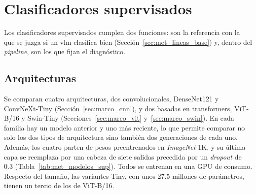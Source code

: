 \section{Clasificadores supervisados}
\label{sec:met_supervisados}

Los clasificadores supervisados cumplen dos funciones: son la referencia con la que se juzga si un \gls{vlm} clasifica
bien (Sección~\ref{sec:met_lineas_base}) y, dentro del \emph{pipeline}, son los que fijan el diagnóstico.

\subsection{Arquitecturas}
\label{sec:met_supervisados_arquitecturas}

Se comparan cuatro arquitecturas, dos convolucionales, DenseNet121 y ConvNeXt-Tiny (Sección~\ref{sec:marco_cnn}), y
dos basadas en transformers, ViT-B/16 y Swin-Tiny (Secciones~\ref{sec:marco_vit} y~\ref{sec:marco_swin}). En cada
familia hay un modelo anterior y uno más reciente, lo que permite comparar no solo los dos tipos de arquitectura sino
también dos generaciones de cada uno. Además, los cuatro parten de pesos preentrenados en \emph{ImageNet}-1K, y su última
capa se reemplaza por una cabeza de siete salidas precedida por un \emph{dropout} de 0.3
(Tabla~\ref{tab:met_modelos_sup}). Todos se entrenan en una GPU de consumo. Respecto del tamaño, las variantes Tiny, con
unos 27.5 millones de parámetros, tienen un tercio de los de ViT-B/16.


